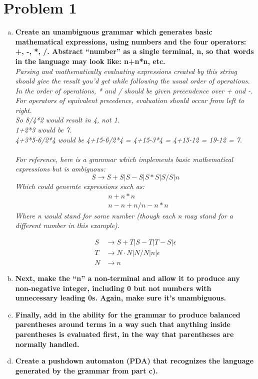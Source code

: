 \documentclass{scrbook}
\begin{document}
\vspace{0.4cm}
\section*{Problem 1}
\begin{enumerate}[a.]
  \item \textbf{Create an unambiguous grammar which generates basic
  mathematical expressions, using numbers and the four operators: +, -, *, /.
  Abstract ``number'' as a single terminal, n, so that words in the language may
  look like: n+n*n, etc.}
  \\
\emph{Parsing and mathematically evaluating expressions created by this string
  should give the result you'd get while following the usual order of
  operations. In the order of operations, * and / should be given precendence
  over + and -. For operators of equivalent precedence, evaluation should occur
  from left to right.\\
So 8/4*2 would result in 4, not 1.\\
1+2*3 would be 7.\\
4+3*5-6/2*4 would be 4+15-6/2*4 = 4+15-3*4 =  4+15-12 = 19-12 = 7.\\
\\
For reference, here is a grammar which implements basic mathematical
expressions but is ambiguous:\\
\[ S \rightarrow S+S | S-S | S*S | S/S | n \]
Which could generate expressions such as:\\
\begin{align*}
&n+n*n\\
&n-n+n/n-n*n
\end{align*}
Where n would stand for some number (though each n may stand for a different
number in this example).}

\par

\begin{align*}
  S &\rightarrow S + T | S - T | T - S | \epsilon \\
  T &\rightarrow N \cdot N | N / N | n | \epsilon\\
  N &\rightarrow n
\end{align*}
\item \textbf{Next, make the ``n'' a non-terminal and allow it to produce any
  non-negative integer, including 0 but not numbers with unnecessary leading
0s. Again, make sure it's unambiguous.}
  \item \textbf{Finally, add in the ability for the grammar to
    produce balanced parentheses around terms in a way such that
    anything inside parentheses is evaluated first, in the way that
    parentheses are normally handled.}
  \item \textbf{Create a pushdown automaton (PDA) that recognizes the language
  generated by the grammar from part c).}

\end{enumerate}
\end{document}
